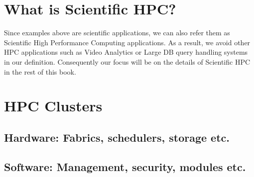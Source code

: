 \section{What is Scientific HPC?}
Since examples above are scientific applications, we can also refer them as Scientific 
High Performance Computing applications. As a result, we avoid other HPC applications 
such as Video Analytics or Large DB query handling systems in our definition. 
Consequently our focus will be on the details of Scientific HPC in the rest of this book.

\section{HPC Clusters}
\subsection{Hardware: Fabrics, schedulers, storage etc.}
\subsection{Software: Management, security, modules etc.}
